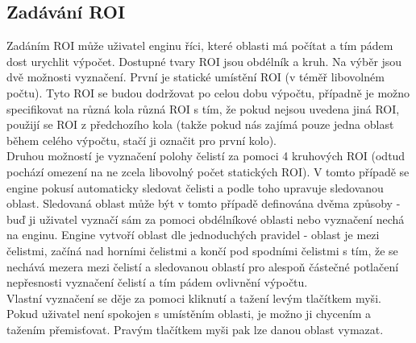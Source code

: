 \documentclass[a4paper,12pt]{article}
\begin{document}
\subsection{Zadávání ROI}
\begin{figure}[H]
\end{figure}
Zadáním ROI může uživatel enginu říci, které oblasti má počítat a tím pádem dost urychlit výpočet. Dostupné tvary ROI jsou obdélník a kruh. Na výběr jsou dvě možnosti vyznačení. První je statické umístění ROI (v téměř libovolném počtu). Tyto ROI se budou dodržovat po celou dobu výpočtu, případně je možno specifikovat na různá kola různá ROI s tím, že pokud nejsou uvedena jiná ROI, použijí se ROI z předchozího kola (takže pokud nás zajímá pouze jedna oblast během celého výpočtu, stačí ji označit pro první kolo).\\
Druhou možností je vyznačení polohy čelistí za pomoci 4 kruhových ROI (odtud pochází omezení na ne zcela libovolný počet statických ROI). V tomto případě se engine pokusí automaticky sledovat čelisti a podle toho upravuje sledovanou oblast. Sledovaná oblast může být v tomto případě definována dvěma způsoby - buď ji uživatel vyznačí sám za pomoci obdélníkové oblasti nebo vyznačení nechá na enginu. Engine vytvoří oblast dle jednoduchých pravidel - oblast je mezi čelistmi, začíná nad horními čelistmi a končí pod spodními čelistmi s tím, že se nechává mezera mezi čelistí a sledovanou oblastí pro alespoň částečné potlačení nepřesnosti vyznačení čelistí a tím pádem ovlivnění výpočtu.\\
Vlastní vyznačení se děje za pomoci kliknutí a tažení levým tlačítkem myši. Pokud uživatel není spokojen s umístěním oblasti, je možno ji chycením a tažením přemisťovat. Pravým tlačítkem myši pak lze danou oblast vymazat.
\end{document}
